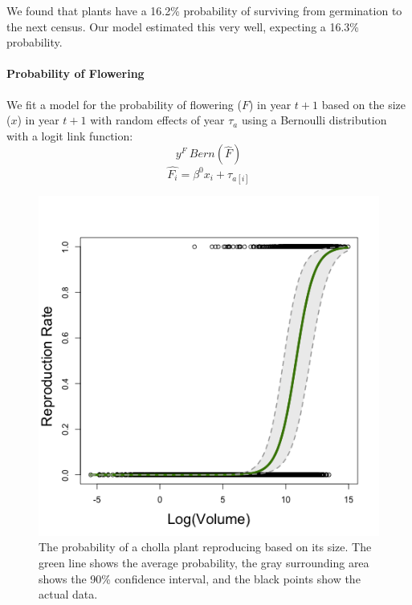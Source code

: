 \documentclass[11pt]{article}
\begin{document}
We found that plants have a 16.2\% probability of surviving from germination to the next census.
Our model estimated this very well, expecting a 16.3\% probability.

\paragraph{Probability of Flowering}
We fit a model for the probability of flowering ($F$) in year $t+1$ based on the size ($x$) in year $t+1$ with random effects of year $\tau_a$ using a Bernoulli distribution with a logit link function: 
$$y^{F}~ Bern(\hat{F})$$
$$\hat{F_i} = \beta^0 x_i + \tau_{a[i]}$$

\begin{figure}
	\includegraphics[width=0.91\linewidth]{Figures/repro_panel.png}
	\caption{The probability of a cholla plant reproducing based on its size. The green line shows the average probability, the gray surrounding area shows the 90\% confidence interval, and the black points show the actual data. }
	\label{app:repro}
\end{figure}
\end{document}
